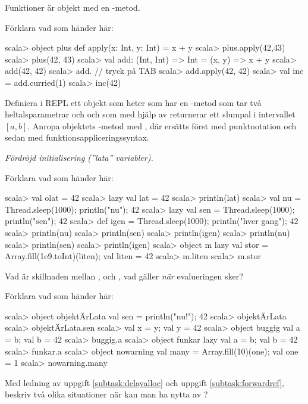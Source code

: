 \Task Funktioner är objekt med en -metod. 

\Subtask Förklara vad som händer här:
\begin{REPL}
scala> object plus { def apply(x: Int, y: Int) = x + y }
scala> plus.apply(42,43)
scala> plus(42, 43)
scala> val add: (Int, Int) => Int = (x, y) => x + y
scala> add(42, 42)
scala> add.   // tryck på TAB
scala> add.apply(42, 42)
scala> val inc = add.curried(1)
scala> inc(42)
\end{REPL}

\Subtask Definiera i REPL ett objekt som heter  som har en -metod som tar två heltalsparametrar  och  och som med hjälp av  returnerar ett slumpal i intervallet $[a, b]$. Anropa objektets -metod med , där  ersätts först med punktnotation och sedan med funktionsappliceringssyntax. 



\Task \emph{Fördröjd initialisering (''lata'' variabler).} 

\Subtask \label{subtask:delayalloc} Förklara vad som händer här:
\begin{REPL}
scala> val olat = 42
scala> lazy val lat = 42
scala> println(lat)
scala> val nu = {Thread.sleep(1000); println("nu"); 42}
scala> lazy val sen = {Thread.sleep(1000); println("sen"); 42}
scala> def igen = {Thread.sleep(1000); println("hver gang"); 42}
scala> println(nu)
scala> println(sen)
scala> println(igen)
scala> println(nu)
scala> println(sen)
scala> println(igen)
scala> object m {lazy val stor = Array.fill(1e9.toInt)(liten); val liten = 42}
scala> m.liten
scala> m.stor
\end{REPL}

\Subtask\Pen Vad är skillnaden mellan ,  och , vad gäller \emph{när} evalueringen sker?


\Subtask \label{subtask:forwardref} Förklara vad som händer här:
\begin{REPL}
scala> object objektÄrLata { val sen = { println("nu!"); 42 } }
scala> objektÄrLata
scala> objektÄrLata.sen
scala> {val x = y; val y = 42}
scala> object buggig {val a = b; val b = 42}
scala> buggig.a
scala> object funkar {lazy val a = b; val b = 42}
scala> funkar.a
scala> object nowarning {val many = Array.fill(10)(one); val one = 1}
scala> nowarning.many
\end{REPL}

\Subtask\Pen Med ledning av uppgift \ref{subtask:delayalloc} och uppgift \ref{subtask:forwardref}, beskriv två olika situationer när kan man ha nytta av ?


